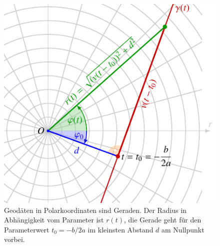 %
%
%
\begin{figure}
\centering
\includegraphics{chapters/100-zusammenhang/images/polargeodaete.pdf}
\caption{Geodäten in Polarkoordinaten sind Geraden.
Der Radius in Abhängigkeit vom Parameter ist $r(t)$, die Gerade
geht für den Parameterwert $t_0=-b/2a$ im kleinsten Abstand $d$
am Nullpunkt vorbei.
\label{buch:zusammenhang:geodaeten:fig:polargeodaete}}
\end{figure}
